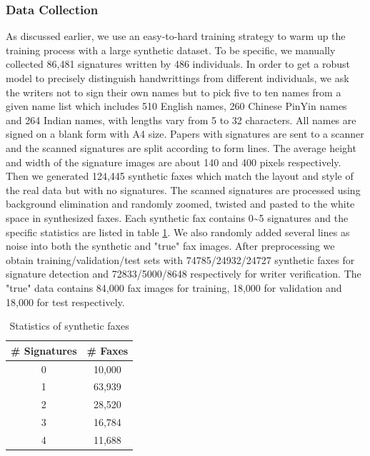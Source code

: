 \documentclass[sigconf]{acmart}
\begin{document}
\subsubsection*{\rm \textbf{Data Collection}}
As discussed earlier, we use an easy-to-hard training strategy to warm up the training process with a large synthetic dataset. To be specific, we manually collected 86,481 signatures written by 486 individuals. In order to get a robust model to precisely distinguish handwrittings from different individuals, we ask the writers not to sign their own names but to pick five to ten names from a given name list which includes 510 English names, 260 Chinese PinYin names and 264 Indian names, with lengths vary from 5 to 32 characters. All names are signed on a blank form with A4 size. Papers with signatures are sent to a scanner and the scanned signatures are split according to form lines. The average height and width of the signature images are about 140 and 400 pixels respectively. Then we generated 124,445 synthetic faxes which match the layout and style of the real data but with no signatures. The scanned signatures are processed using background elimination and randomly zoomed, twisted and pasted to the white space in synthesized faxes. Each synthetic fax contains 0\textasciitilde5 signatures and the specific statistics are listed in table \ref{stat sig}. We also randomly added several lines as noise into both the synthetic and "true" fax images. After preprocessing we obtain training/validation/test sets with 74785/24932/24727 synthetic faxes for signature detection and 72833/5000/8648 respectively for writer verification. The "true" data contains 84,000 fax images for training, 18,000 for validation and 18,000 for test respectively.
\begin{table}
	\caption{Statistics of synthetic faxes}
	\label{stat sig}
	\centering
	\begin{tabular}{cc}
		\toprule
		\textbf{\# Signatures} & \textbf{\# Faxes}\\
		\midrule
		0 & 10,000 \\
		1 & 63,939 \\
		2 & 28,520 \\
		3 & 16,784 \\
		4 & 11,688 \\
		\bottomrule
	\end{tabular}
\end{table}
\end{document}
